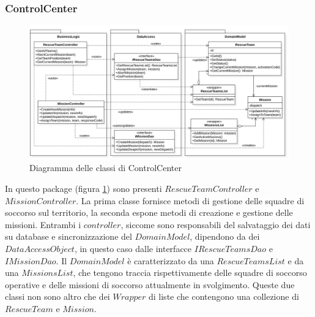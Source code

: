 \documentclass{article}
\begin{document}
    \subsubsection{ControlCenter}
    \begin{figure}
        \centering
        \includegraphics[width=6in]{diagrams/png/uml-controlcenter.png}
        \caption{Diagramma delle classi di ControlCenter}
        \label{fig:uml-controlcenter}
    \end{figure}
    In questo package (figura \ref{fig:uml-controlcenter}) sono presenti $RescueTeamController$ e $MissionController$. La prima classe fornisce metodi di gestione delle squadre di soccorso sul territorio,
    la seconda espone metodi di creazione e gestione delle missioni.
    Entrambi i $controller$, siccome sono responsabili del salvataggio dei dati su database e sincronizzazione del $DomainModel$, dipendono da dei $DataAccessObject$, in questo caso dalle interfacce $IRescueTeamsDao$ e $IMissionDao$.
    Il $DomainModel$ è caratterizzato da una $RescueTeamsList$ e da una $MissionsList$, che tengono traccia rispettivamente delle squadre di soccorso operative e delle missioni di soccorso attualmente in svolgimento.
    Queste due classi non sono altro che dei $Wrapper$ di liste che contengono una collezione di $RescueTeam$ e $Mission$.
\end{document}
